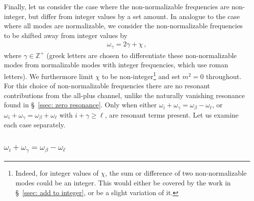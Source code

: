 \documentclass[letterpaper,11pt]{article}
\newcommand{\oi}{\omega_i}
\newcommand{\ol}{\omega_\ell}
\newcommand{\obet}{\omega_{\beta}}
\newcommand{\ogam}{\omega_\gamma}
\begin{document}
Finally, let us consider the case where the non-normalizable frequencies are non-integer, but differ from integer values by a set amount. In analogue to the case where all modes are normalizable, we consider the non-normalizable frequencies to be shifted away from integer values by
\begin{align}
\label{int plus chi}
\ogam = 2\gamma + \chi \, ,
\end{align}
where $\gamma \in \mathbb{Z}^+$ (greek letters are chosen to differentiate these non-normalizable modes from normalizable modes with integer frequencies, which use roman letters). We furthermore limit $\chi$ to be non-integer\footnote{Indeed, for integer values of $\chi$, the sum or difference of two non-normalizable modes could be an integer. This would either be covered by the work in \S\!~\ref{ssec: add to integer}, or be a slight variation of it.} and set $m^2 = 0$ throughout. For this choice of non-normalizable frequencies there are no resonant contributions from the all-plus channel, unlike the naturally vanishing resonance found in \S\!~\ref{ssec: zero resonance}. Only when either $\oi + \ogam = \obet - \ol$, or $\oi + \ogam = \obet + \ol$ with $i + \gamma \geq \ell$, are resonant terms present. Let us examine each case separately.

\subsubsection{$\oi + \ogam = \obet - \ol$}
\label{sssec: intpluschi1}
\end{document}
